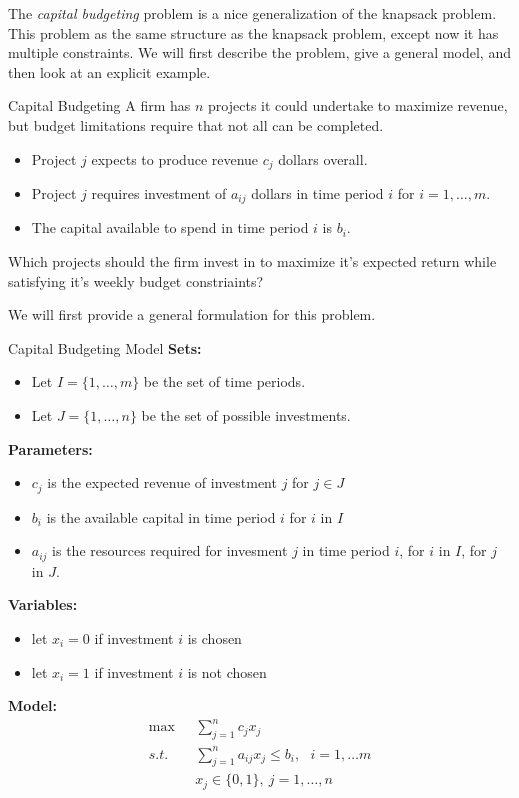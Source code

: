 
The \emph{capital budgeting} problem is a nice generalization of the knapsack problem.   This problem as the same structure as the knapsack problem, except now it has multiple constraints.   We will first describe the problem, give a general model, and then look at an explicit example.

\begin{general}{Capital Budgeting}{}
\label{general:capital-budgeting}
A firm has $n$ projects it could undertake to maximize revenue, but budget limitations require that not all can be completed.
\begin{itemize}
\item Project $j$ expects to produce revenue $c_j$ dollars overall.
\item Project $j$ requires investment of $a_{ij}$ dollars in time period $i$ for $i = 1,\ldots,m$.
\item The capital available to spend in time period $i$ is $b_i$.
\end{itemize}
Which projects should the firm invest in to maximize it's expected return while satisfying it's weekly budget constriaints?
\end{general}

\newpage

We will first provide a general formulation for this problem.

\begin{general}{Capital Budgeting Model}{}
\noindent \textbf{Sets:}
\begin{itemize}
\item Let $I = \{1, \dots, m\}$ be the set of time periods.
\item Let $J = \{1, \dots, n\}$ be the set of possible investments.
\end{itemize}

\noindent \textbf{Parameters:}
\begin{itemize}
\item $c_j$ is the expected revenue of investment $j$ for $j \in J$
\item $b_i$ is the available capital in time period $i$ for $i$ in  $I$
\item $a_{ij}$ is the resources required for invesment $j$ in time period $i$, for $i$ in $I$, for $j$ in $J$.
\end{itemize}

\noindent \textbf{Variables:}
\begin{itemize}
\item let $x_i = 0$ if investment $i$ is chosen
\item let $x_i = 1$ if investment $i$ is not chosen
\end{itemize}
\textbf{Model:}
\begin{align*}
	\max ~~~& \sum_{j = 1}^n c_jx_j \tag{Total Expected Revenue}\\
	s.t. ~~~&\sum_{j = 1}^n a_{ij}x_j\leq b_i, ~~~i = 1,\ldots m  \tag{ Resource constraint week $i$}\\
	& x_j \in \{0,1\} , \ j = 1,\ldots,n
	\end{align*}

\end{general}



